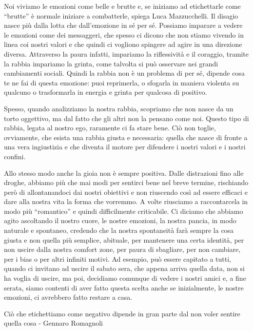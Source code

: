 \documentclass[12pt]{book} %
\begin{document}
Noi viviamo le emozioni come belle e brutte e, se iniziamo ad etichettarle come “brutte” è normale iniziare a
combatterle, spiega Luca Mazzucchelli. Il disagio nasce più dalla lotta che dall'emozione in sé
per sé. Possiamo imparare a vedere le emozioni come dei messaggeri, che spesso ci dicono che non stiamo vivendo in
linea coi nostri valori e che quindi ci vogliono spingere ad agire in una direzione diversa. Attraverso la paura
infatti, impariamo la riflessività e il coraggio, tramite la rabbia impariamo la grinta, come talvolta si può osservare nei grandi cambiamenti sociali. Quindi la rabbia non è un problema di per sé, dipende cosa te ne fai di questa emozione: puoi
reprimerla, o sfogarla in maniera violenta su qualcuno o trasformarla in energia e grinta per qualcosa di positivo.

Spesso, quando analizziamo la nostra rabbia, scopriamo che non nasce da un torto oggettivo, ma dal fatto che gli altri non la pensano come noi. Questo tipo di rabbia, legata al nostro ego, raramente ci fa stare bene. Ciò non toglie, ovviamente, che esista una rabbia giusta e necessaria: quella che nasce di fronte a una vera ingiustizia e che diventa il motore per difendere i nostri valori e i nostri confini.

Allo stesso modo anche la gioia non è sempre positiva. Dalle distrazioni fino alle droghe, abbiamo più che mai modi per
sentirci bene nel breve termine, rischiando però di allontanandoci dai nostri obiettivi e non riuscendo così ad essere efficaci e
dare alla nostra vita la forma che vorremmo. A volte riusciamo a raccontarcela in modo più “romantico” e quindi
difficilmente criticabile. Ci diciamo che abbiamo agito ascoltando il nostro cuore, le nostre emozioni, la nostra
pancia, in modo naturale e spontaneo, credendo che la nostra spontaneità farà sempre la cosa giusta e non quella più
semplice, abituale, per mantenere una certa identità, per non uscire dalla nostra comfort zone, per paura di sbagliare,
per non cambiare, per i bias o per altri infiniti motivi. Ad esempio, può essere capitato a tutti, quando ci invitano ad
uscire il sabato sera, che appena arriva quella data, non si ha voglia di uscire, ma poi, decidiamo comunque di vedere i
nostri amici e, a fine serata, siamo contenti di aver fatto questa scelta anche se inizialmente, le nostre emozioni, ci avrebbero
fatto restare a casa.

Ciò che etichettiamo come negativo dipende in gran parte dal non voler sentire quella cosa - Gennaro Romagnoli
\end{document}
